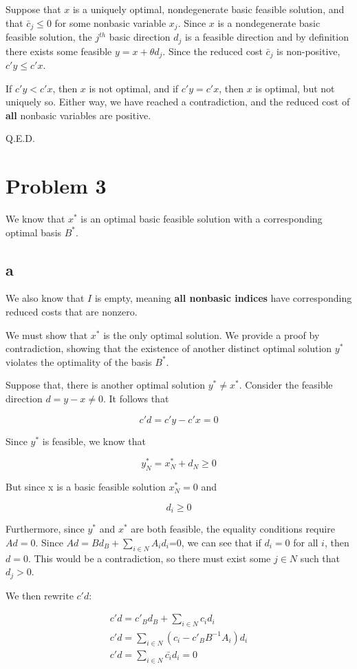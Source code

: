 \documentclass[11pt,a4paper]{article}
\begin{document}
Suppose that $x$ is a uniquely optimal, nondegenerate basic feasible solution, and that $\bar{c}_j\leq 0$ for some nonbasic variable $x_j$. Since $x$ is a nondegenerate basic feasible solution, the $j^{th}$ basic direction $d_j$ is a feasible direction and by definition there exists some feasible $y=x+\theta d_j$. Since the reduced cost $\bar{c}_j$ is non-positive, $c'y\leq c'x$.

If $c'y<c'x$, then $x$ is not optimal, and if $c'y=c'x$, then $x$ is optimal, but not uniquely so. Either way, we have reached a contradiction, and the reduced cost of \textbf{all} nonbasic variables are positive. 

Q.E.D.

\section{Problem 3}

We know that $x^*$ is an optimal basic feasible solution with a corresponding optimal basis $B^*$. 

\subsection{a}
We also know that $I$ is empty, meaning \textbf{all nonbasic indices} have corresponding reduced costs that are nonzero. 

We must show that $x^*$ is the only optimal solution. We provide a proof by contradiction, showing that the existence of another distinct optimal solution $y^*$ violates the optimality of the basis $B^*$.

Suppose that, there is another optimal solution $y^*\neq x^*$. Consider the feasible direction $d=y-x\neq0$. It follows that

$$
c'd=c'y-c'x=0
$$

Since $y^*$ is feasible, we know that

$$
y^*_N = x^*_N+d_N\geq 0
$$

But since x is a basic feasible solution $x_N^*=0$ and

$$
d_i\geq 0
$$

Furthermore, since $y^*$ and $x^*$ are both feasible, the equality conditions require $Ad=0$. Since $Ad=Bd_B+\sum_{i\in N}A_id_i$=0, we can see that if $d_i=0$ for all $i$, then $d=0$. This would be a contradiction, so there must exist some $j\in N$ such that $d_j>0$. 

We then rewrite $c'd$:

\begin{equation}
\begin{split}
c'd=c'_Bd_B + \sum_{i\in N}c_id_i\\
c'd=\sum_{i\in N}(c_i-c'_BB^{-1}A_i)d_i\\
c'd=\sum_{i\in N}\bar{c_i}d_i=0
\end{split}
\end{equation}
\end{document}
